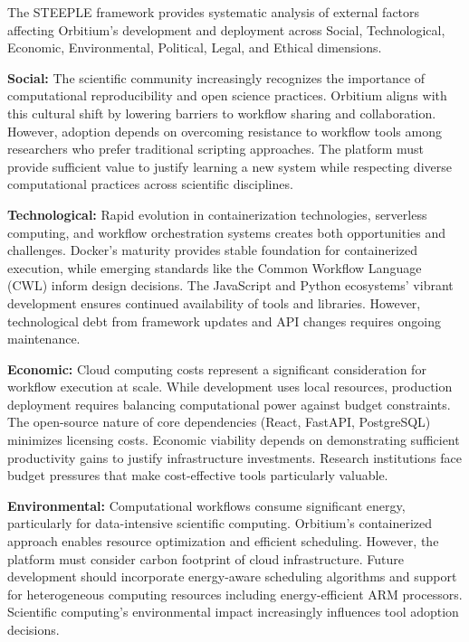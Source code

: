 \documentclass[12pt]{article}
\begin{document}
\hspace{\parindent}The STEEPLE framework provides systematic analysis of external factors affecting Orbitium's development and deployment across Social, Technological, Economic, Environmental, Political, Legal, and Ethical dimensions.

\hspace{\parindent}\textbf{Social:} The scientific community increasingly recognizes the importance of computational reproducibility and open science practices. Orbitium aligns with this cultural shift by lowering barriers to workflow sharing and collaboration. However, adoption depends on overcoming resistance to workflow tools among researchers who prefer traditional scripting approaches. The platform must provide sufficient value to justify learning a new system while respecting diverse computational practices across scientific disciplines.

\hspace{\parindent}\textbf{Technological:} Rapid evolution in containerization technologies, serverless computing, and workflow orchestration systems creates both opportunities and challenges. Docker's maturity provides stable foundation for containerized execution, while emerging standards like the Common Workflow Language (CWL) \cite{amstutz2016common} inform design decisions. The JavaScript and Python ecosystems' vibrant development ensures continued availability of tools and libraries. However, technological debt from framework updates and API changes requires ongoing maintenance.

\hspace{\parindent}\textbf{Economic:} Cloud computing costs represent a significant consideration for workflow execution at scale. While development uses local resources, production deployment requires balancing computational power against budget constraints. The open-source nature of core dependencies (React, FastAPI, PostgreSQL) minimizes licensing costs. Economic viability depends on demonstrating sufficient productivity gains to justify infrastructure investments. Research institutions face budget pressures that make cost-effective tools particularly valuable.

\hspace{\parindent}\textbf{Environmental:} Computational workflows consume significant energy, particularly for data-intensive scientific computing. Orbitium's containerized approach enables resource optimization and efficient scheduling. However, the platform must consider carbon footprint of cloud infrastructure. Future development should incorporate energy-aware scheduling algorithms and support for heterogeneous computing resources including energy-efficient ARM processors. Scientific computing's environmental impact increasingly influences tool adoption decisions.
\end{document}
